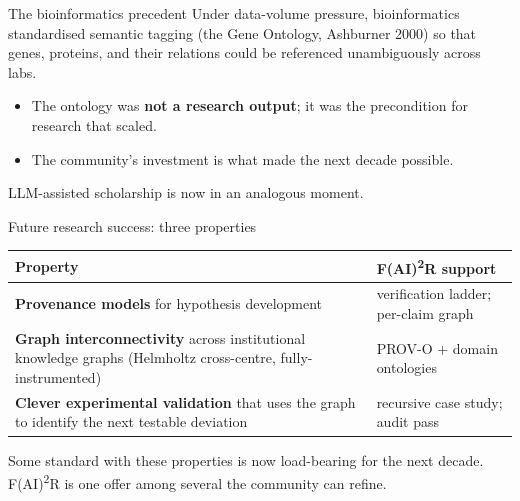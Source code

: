 \documentclass[aspectratio=169,11pt]{beamer}
\begin{document}
\begin{frame}{The bioinformatics precedent}
  Under data-volume pressure, bioinformatics standardised semantic tagging
  (the Gene Ontology, Ashburner 2000) so that genes, proteins, and their
  relations could be referenced unambiguously across labs.

  \begin{itemize}
    \item The ontology was \textbf{not a research output}; it was the precondition for research that scaled.
    \item The community's investment is what made the next decade possible.
  \end{itemize}

  \vspace{0.4em}
  LLM-assisted scholarship is now in an analogous moment.
\end{frame}

\begin{frame}{Future research success: three properties}
  \footnotesize
  \begin{tabular}{p{4.6cm}p{6.4cm}}
    \toprule
    Property & F(AI)\textsuperscript{2}R support \\
    \midrule
    \textbf{Provenance models} for hypothesis development & verification ladder; per-claim graph \\
    \addlinespace
    \textbf{Graph interconnectivity} across institutional knowledge graphs (Helmholtz cross-centre, fully-instrumented) & PROV-O + domain ontologies \\
    \addlinespace
    \textbf{Clever experimental validation} that uses the graph to identify the next testable deviation & recursive case study; audit pass \\
    \bottomrule
  \end{tabular}

  \vspace{0.6em}
  \normalsize
  Some standard with these properties is now load-bearing for the next decade.\\
  F(AI)\textsuperscript{2}R is one offer among several the community can refine.
\end{frame}

\end{document}

